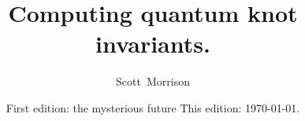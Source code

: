 \title{Computing quantum knot invariants.}

\author{Scott~Morrison}
\address{
}
\email{}
\urladdr{}

\date{
  First edition: the mysterious future
  This edition: \today.
}

\primaryclass{} \secondaryclass{}
\keywords{
}

